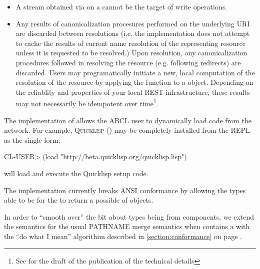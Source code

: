 \documentclass[10pt]{book}
\begin{document}
\begin{itemize}

\item A stream obtained via  on a 
  cannot be the target of write operations.

\item Any results of canonicalization procesures performed on the
  underlying \textsc{URI} are discarded between resolutions (i.e. the
  implementation does not attempt to cache the results of current name
  resolution of the representing resource unless it is requested to be
  resolved.)  Upon resolution, any canonicalization procedures
  followed in resolving the resource (e.g. following redirects) are
  discarded.  Users may programatically initiate a new, local
  computation of the resolution of the resource by applying the
   function to a  object.
  Depending on the reliablity and properties of your local
  \textsc{REST} infrastructure, these results may not necessarily be
  idempotent over time\footnote {See \cite{evenson2011} for the draft
    of the publication of the technical details}.

\end{itemize}

The implementation of  allows the \textsc{ABCL}
user to dynamically load code from the network.  For example,
\textsc{Quicklisp} (\cite{quicklisp}) may be completely installed from
the \textsc{REPL} as the single form:

\begin{listing-lisp}
  CL-USER> (load "http://beta.quicklisp.org/quicklisp.lisp")
\end{listing-lisp}

will load and execute the Quicklisp setup code.

The implementation currently breaks \textsc{ANSI} conformance by allowing the
types able to be  for the  to return a possible  of
 objects.  %

In order to ``smooth over'' the bit about types being 
from  components, we extend the semantics for the
usual PATHNAME merge semantics when 
contains a  with the ``do what I mean''
algorithim described in \ref{section:conformance} on page
\pageref{section:conformance}.

\end{document}
